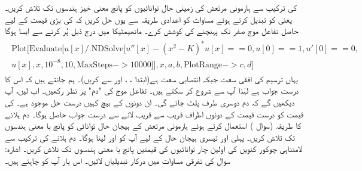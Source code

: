  کی ترکیب سے ہارمونی مرتعش کی زمینی حال توانائیوں کو پانچ معنی خیز ہندسوں تک تلاش کریں۔ یعنی  کو تبدیل کرتے ہوئے مساوات  کو اعدادی طریقہ سے یوں حل کریں کہ  کی بڑی قیمت کے لیے حاصل تفاعل موج صفر تک پہنچنے کی کوشش کرے۔ ماتھیمٹیکا میں درج ذیل پُر کرنے سے ایسا ہوگا
\begin{gather*}
\begin{aligned}
	\text{Plot}[\text{Evaluate}[u[x]/.\text{NDSolve}[{u''[x]-(x^2-K)^*u[x]==0, u[0]==1, u'[0]==0},\\
	u[x],{x, 10^{-8}, 10}, \text{MaxSteps}->\num{10000}]], {x, a, b}, \text{PlotRange}->{c, d}]
\end{aligned}
\end{gather*}
یہاں  ترسیم کی افقی سعت  جبکہ  انتصابی سعت ہے(ابتدا ، ، اور  سے کریں)۔ ہم جانتے ہیں کہ اس کا درست جواب  ہے لہٰذا آپ  سے شروع کر سکتے ہیں۔ تفاعل موج کی "دم" پر نظر رکھیں۔ اب  لیں، آپ دیکھیں گے کہ دم دوسری طرف پلٹ جائے گی۔ ان دونوں کے بیچ کہیں درست حل موجود ہے۔  کی قیمت کو درست قیمت کے دونوں اطراف قریب سے قریب لانے سے درست جواب حاصل ہوگا۔
دم ہلانے کا طریقہ (سوال ) استعمال کرتے ہوئے ہارمونی مرتعش کے ہیجان حال توانائی کو پانچ با معنی ہندسوں تک تلاش کریں۔ پہلی اور تیسری ہیجان حال کے لیے آپ کو  اور  لینا ہوگا۔
دم ہلانے کی ترکیب سے لامتناہی چوکور کنویں  کی اولین چار توانائیوں کی قیمتیں پانچ با معنی ہندسوں تک تلاش کریں۔ اشارہ: سوال   کی تفرقی مساوات میں درکار تبدیلیاں لائیں۔ اس بار آپ کو چاہتے ہیں۔

